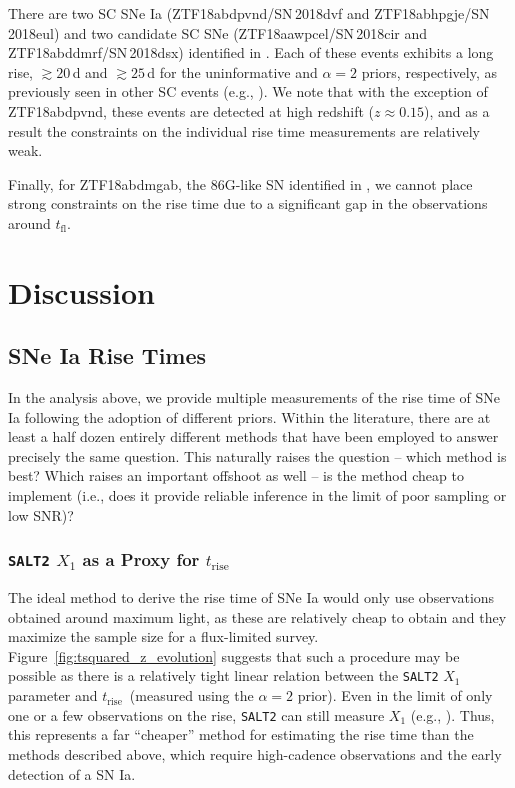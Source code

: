 \documentclass[twocolumn]{./aastex63}
\newcommand{\tfl}{$t_\mathrm{fl}$}
\newcommand{\trise}{$t_\mathrm{rise}$}
\begin{document}
There are two SC SNe Ia (ZTF18abdpvnd/SN\,2018dvf and ZTF18abhpgje/SN\,2018eul)
and two candidate SC SNe (ZTF18aawpcel/SN\,2018cir and ZTF18abddmrf/SN\,2018dsx)
identified in \citet{Yao19}. Each of these events exhibits a long rise, $\gtrsim
20$\,d and $\gtrsim 25$\,d for the uninformative and $\alpha=2$ priors,
respectively, as previously seen in other SC events (e.g.,
\citealt{Scalzo10,Silverman11}). We note that with the exception of
ZTF18abdpvnd, these events are detected at high redshift ($z \approx 0.15$), and
as a result the constraints on the individual rise time measurements are
relatively weak.

Finally, for ZTF18abdmgab, the 86G-like SN identified in \citet{Yao19}, we
cannot place strong constraints on the rise time due to a significant gap in the
observations around \tfl.

\section{Discussion}

\subsection{SNe Ia Rise Times}

In the analysis above, we provide multiple measurements of the rise time of SNe
Ia following the adoption of different priors. Within the literature, there are
at least a half dozen entirely different methods that have been employed to
answer precisely the same question. This naturally raises the question -- which
method is best? Which raises an important offshoot as well -- is the method
cheap to implement (i.e., does it provide reliable inference in the limit of
poor sampling or low SNR)?

\subsubsection{\texttt{SALT2} $X_1$ as a Proxy for \trise}

The ideal method to derive the rise time of SNe Ia would only use observations
obtained around maximum light, as these are relatively cheap to obtain and they
maximize the sample size for a flux-limited survey.
Figure~\ref{fig:tsquared_z_evolution} suggests that such a procedure may be
possible as there is a relatively tight linear relation between the
\texttt{SALT2} $X_1$ parameter and \trise\ (measured using the $\alpha = 2$
prior). Even in the limit of only one or a few observations on the rise,
\texttt{SALT2} can still measure $X_1$ (e.g., \citealt{Scolnic18a}). Thus, this
represents a far ``cheaper'' method for estimating the rise time than the
methods described above, which require high-cadence observations and the early
detection of a SN Ia.
\end{document}
